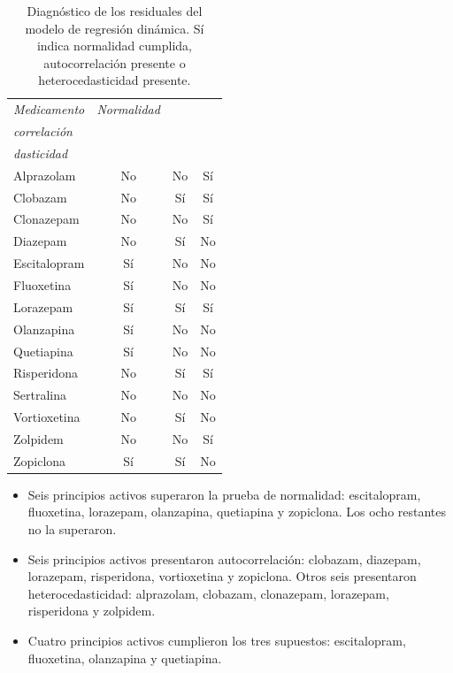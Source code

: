 \documentclass[10pt,twoside,xcolor=table,x11anmes]{IEEEtran}
\begin{document}
\begin{table}[htbp]
\centering
\caption{Diagnóstico de los residuales del modelo de regresión dinámica. Sí indica normalidad cumplida, autocorrelación presente o heterocedasticidad presente.}
\label{tab:diagnostico_residuales}
\begin{tabular}{lccc}
\toprule
\textit{Medicamento} & \textit{Normalidad} & \makecell{\textit{Auto-}\\\textit{correlación}}& \makecell{\textit{Heteroce-}\\\textit{dasticidad}} \\
\midrule
Alprazolam   & No & No & Sí \\
Clobazam     & No & Sí & Sí \\
Clonazepam   & No & No & Sí \\
Diazepam     & No & Sí & No \\
Escitalopram & Sí & No & No \\
Fluoxetina   & Sí & No & No \\
Lorazepam    & Sí & Sí & Sí \\
Olanzapina   & Sí & No & No \\
Quetiapina   & Sí & No & No \\
Risperidona  & No & Sí & Sí \\
Sertralina   & No & No & No \\
Vortioxetina & No & Sí & No \\
Zolpidem     & No & No & Sí \\
Zopiclona    & Sí & Sí & No \\
\bottomrule
\end{tabular}
\end{table}

\begin{itemize}
    \item Seis principios activos superaron la prueba de normalidad: escitalopram, fluoxetina, lorazepam, olanzapina, quetiapina y zopiclona. Los ocho restantes no la superaron.
    \item Seis principios activos presentaron autocorrelación: clobazam, diazepam, lorazepam, risperidona, vortioxetina y zopiclona. Otros seis presentaron heterocedasticidad: alprazolam, clobazam, clonazepam, lorazepam, risperidona y zolpidem.
    \item Cuatro principios activos cumplieron los tres supuestos: escitalopram, fluoxetina, olanzapina y quetiapina.

\end{itemize}
\end{document}
